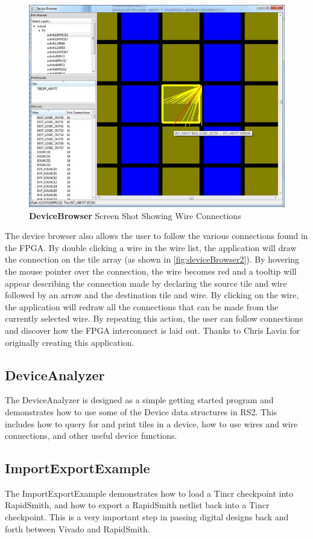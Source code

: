 \documentclass[10pt]{article}
\newcommand{\pgm}[1]{{\textbf{#1}}}
\begin{document}
\begin{figure}[htb]
\centering
\includegraphics[width=0.8\columnwidth]{deviceBrowser2}
\caption{\pgm{DeviceBrowser} Screen Shot Showing Wire Connections}
\label{fig:deviceBrowser2}
\end{figure}

The device browser also allows the user to follow the various connections found
in the FPGA.  By double clicking a wire in the wire list, the application will
draw the connection on the tile array (as shown in
\autoref{fig:deviceBrowser2}). By hovering the mouse pointer over the
connection, the wire becomes red and a tooltip will appear describing the
connection made by declaring the source tile and wire followed by an arrow and
the destination tile and wire.  By clicking on the wire, the application will
redraw all the connections that can be made from the currently selected wire. 
By repeating this action, the user can follow connections and discover how the
FPGA interconnect is laid out. Thanks to Chris Lavin for originally creating
this application.

\subsection{\pgm{DeviceAnalyzer}}
The DeviceAnalyzer is designed as a simple getting started program and
demonstrates how to use some of the Device data structures in RS2. This
includes how to query for and print tiles in a device, how to use wires and
wire connections, and other useful device functions.

\subsection{\pgm{ImportExportExample}} \label{sec:importExportExample}
The ImportExportExample demonstrates how to load a Tincr checkpoint into
RapidSmith, and how to export a RapidSmith netlist back into a Tincr
checkpoint. This is a very important step in passing digital designs back
and forth between Vivado and RapidSmith.
\end{document}
